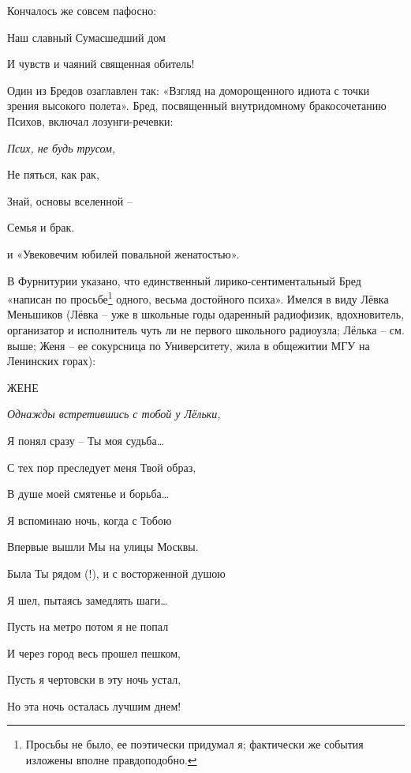 \indent

\noindent
Кончалось же совсем пафосно:



{\itshape

    \indent
    
	Наш славный Сумасшедший дом
	
	И чувств и чаяний священная обитель!
}


\indent

Один из Бредов озаглавлен так: «Взгляд на доморощенного идиота с точки зрения высокого полета». Бред, посвященный внутридомному бракосочетанию Психов, включал лозунги-речевки:


\indent

{\itshape
    Псих, не будь трусом,
    
	Не пяться, как рак,
	
	Знай, основы вселенной – 
	
	Семья и брак.
}

\indent 

\noindent
и «Увековечим юбилей повальной женатостью».


В Фурнитурии указано, что единственный лирико-сентиментальный Бред «написан по просьбе\footnote{Просьбы не было, ее поэтически придумал я; фактически же события изложены вполне правдоподобно.}  одного, весьма достойного психа». Имелся в виду Лёвка Меньшиков (Лёвка – уже в школьные годы одаренный радиофизик, вдохновитель, организатор и исполнитель чуть ли не первого школьного радиоузла; Лёлька – см. выше; Женя – ее сокурсница по Университету, жила в общежитии МГУ на Ленинских горах):

\indent

\begin{center}
ЖЕНЕ
\end{center}

{\itshape
Однажды встретившись с тобой у Лёльки,

Я понял сразу – Ты моя судьба…

С тех пор преследует меня Твой образ,

В душе моей смятенье и борьба…

\indent

Я вспоминаю ночь, когда с Тобою

Впервые вышли Мы на улицы Москвы.

Была Ты рядом (!), и с восторженной душою

Я шел, пытаясь замедлять шаги…

\indent

Пусть на метро потом я не попал

И через город весь прошел пешком,

Пусть я чертовски в эту ночь устал,

Но эта ночь осталась лучшим днем!

\indent

}

